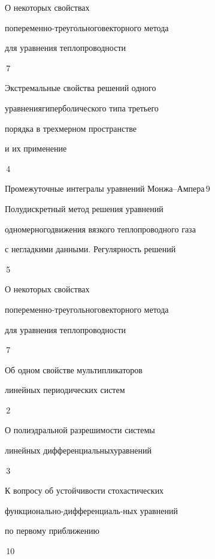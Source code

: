 

{О некоторых свойствах


попеременно-треугольного\newline векторного метода


для уравнения теплопроводности}{\No\,7}




{Экстремальные свойства решений одного 


уравнения\newline гиперболического типа третьего 


порядка в трехмерном пространстве  


и их применение}{\No\,4}




{Промежуточные интегралы уравнений Монжа--Ампера}{\No\,9}




{Полудискретный метод решения уравнений


одномерного\newline движения вязкого теплопроводного газа


с негладкими данными. Регулярность решений}{\No\,5}




{О некоторых свойствах


попеременно-треугольного\newline векторного метода


для уравнения теплопроводности}{\No\,7}




{Об одном свойстве мультипликаторов


линейных периодических систем}{\No\,2}




{О полиэдральной разрешимости системы 


линейных дифференциальных\newline уравнений}{\No\,3}






{К вопросу об устойчивости стохастических


функционально-дифференциаль-\newline ных уравнений 


по первому приближению}{\No\,10}


